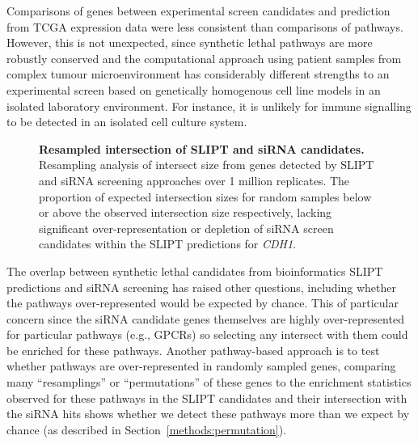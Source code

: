 Comparisons of genes between experimental screen candidates and prediction from TCGA expression data were less consistent than comparisons of pathways. However, this is not unexpected, since synthetic lethal pathways are more robustly conserved \citep{Dixon2008} and the computational approach using patient samples from complex tumour microenvironment has considerably different strengths to an experimental screen \citep{Telford2015} based on genetically homogenous cell line models in an isolated laboratory environment. For instance, it is unlikely for immune signalling to be detected in an isolated cell culture system.

\begin{figure}[!ht]
  \centering
   \caption[Resampled intersection of SLIPT and siRNA candidates]{\small \textbf{Resampled intersection of \gls{SLIPT} and siRNA candidates.} Resampling analysis of intersect size from genes detected by \gls{SLIPT} and siRNA screening approaches over 1 million replicates. The proportion of expected intersection sizes for random samples below or above the observed intersection size respectively, lacking significant over-represent\-ation or depletion of siRNA screen candidates within the \gls{SLIPT} predictions for \textit{CDH1}.
}
\label{fig:perm_sample}
\end{figure}

The overlap between synthetic lethal candidates from bioinformatics \gls{SLIPT} predictions and siRNA screening has raised other questions, including whether the pathways over-represented would be expected by chance. This of particular concern since the siRNA candidate genes themselves are highly over-represented for particular pathways (e.g., GPCRs) so selecting any intersect with them could be enriched for these pathways. Another pathway-based approach is to test whether pathways are over-represented in randomly sampled genes, comparing many ``resamplings'' or ``permutations'' of these genes to the enrichment statistics observed for these pathways in the \gls{SLIPT} candidates and their intersection with the siRNA hits shows whether we detect these pathways more than we expect by chance (as described in Section~\ref{methods:permutation}). 

